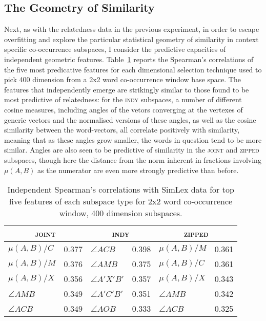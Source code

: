 \subsection{The Geometry of Similarity}
Next, as with the relatedness data in the previous experiment, in order to escape overfitting and explore the particular statistical geometry of similarity in context specific co-occurrence subspaces, I consider the predictive capacities of independent geometric features.  Table~\ref{tab:ind-similar} reports the Spearman's correlations of the five most predicative features for each dimensional selection technique used to pick 400 dimension from a 2x2 word co-occurrence window base space.  The features that independently emerge are strikingly similar to those found to be most predictive of relatedness: for the \textsc{indy} subspaces, a number of different cosine measures, including angles of the vetors converging at the vertexes of generic vectors and the normalised versions of these angles, as well as the cosine similarity between the word-vectors, all correlate positively with similarity, meaning that as these angles grow smaller, the words in question tend to be more similar.  Angles are also seen to be predictive of similarity in the \textsc{joint} and \textsc{zipped} subspaces, though here the distance from the norm inherent in fractions involving $\mu(A,B)$ as the numerator are even more strongly predictive than before.

\begin{table}
\centering
\begin{tabular}{lr|lr|lr}
\hline
\multicolumn{2}{c}{\textsc{joint}} & \multicolumn{2}{c}{\textsc{indy}} & \multicolumn{2}{c}{\textsc{zipped}} \\
\hline
$\mu (A,B)/C$ & 0.377 & $\angle ACB$ & 0.398 & $\mu (A,B)/M$ & 0.361 \\
$\mu (A,B)/M$ & 0.376 & $\angle AMB$ & 0.375 & $\mu (A,B)/C$ & 0.361 \\
$\mu (A,B)/X$ & 0.356 & $\angle A'X'B'$ & 0.357 & $\mu (A,B)/X$ & 0.343 \\
$\angle AMB$ & 0.349 & $\angle A'C'B'$ & 0.351 & $\angle AMB$ & 0.342 \\
$\angle ACB$ & 0.349 & $\angle AOB$ & 0.333 & $\angle ACB$ & 0.325 \\
\hline
\end{tabular}
\caption{Independent Spearman's correlations with SimLex data for top five features of each subspace type for 2x2 word co-occurrence window, 400 dimension subspaces.}
\label{tab:ind-similar}
\end{table}

